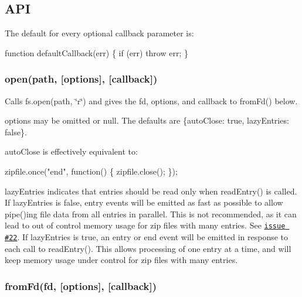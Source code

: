 \subsection*{A\+PI}

The default for every optional {\ttfamily callback} parameter is\+:


\begin{DoxyCode}
function defaultCallback(err) \{
  if (err) throw err;
\}
\end{DoxyCode}


\subsubsection*{open(path, \mbox{[}options\mbox{]}, \mbox{[}callback\mbox{]})}

Calls {\ttfamily fs.\+open(path, \char`\"{}r\char`\"{})} and gives the {\ttfamily fd}, {\ttfamily options}, and {\ttfamily callback} to {\ttfamily from\+Fd()} below.

{\ttfamily options} may be omitted or {\ttfamily null}. The defaults are {\ttfamily \{auto\+Close\+: true, lazy\+Entries\+: false\}}.

{\ttfamily auto\+Close} is effectively equivalent to\+:


\begin{DoxyCode}
zipfile.once("end", function() \{
  zipfile.close();
\});
\end{DoxyCode}


{\ttfamily lazy\+Entries} indicates that entries should be read only when {\ttfamily read\+Entry()} is called. If {\ttfamily lazy\+Entries} is {\ttfamily false}, {\ttfamily entry} events will be emitted as fast as possible to allow {\ttfamily pipe()}ing file data from all entries in parallel. This is not recommended, as it can lead to out of control memory usage for zip files with many entries. See \href{https://github.com/thejoshwolfe/yauzl/issues/22}{\tt issue \#22}. If {\ttfamily lazy\+Entries} is {\ttfamily true}, an {\ttfamily entry} or {\ttfamily end} event will be emitted in response to each call to {\ttfamily read\+Entry()}. This allows processing of one entry at a time, and will keep memory usage under control for zip files with many entries.

\subsubsection*{from\+Fd(fd, \mbox{[}options\mbox{]}, \mbox{[}callback\mbox{]})}

